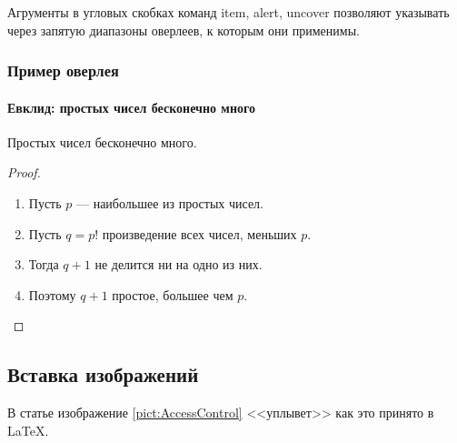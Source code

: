 Агрументы в угловых скобках команд item, alert, uncover позволяют указывать через запятую диапазоны оверлеев, к которым они применимы.
\begin{frame}
    \frametitle{Пример оверлея}
    \framesubtitle{Евклид: простых чисел бесконечно много}
    
    \begin{theorem}
        Простых чисел бесконечно много.
    \end{theorem}
    \begin{proof}
        \begin{enumerate}
            \item<1-> Пусть \alert<1,4>{$p$ --- наибольшее из простых} чисел.
            \item<2-> Пусть $q=p!$ произведение всех чисел, меньших $p$.
            \item<3-> Тогда $q + 1$ \alert<3>{не делится} ни на одно из них.
            \item<1-> Поэтому $q + 1$ \alert<4>{простое, большее чем $p$}.\qedhere
        \end{enumerate}
    \end{proof}
\end{frame}


\subsection{Вставка изображений}

В статье изображение \ref{pict:AccessControl} <<уплывет>> как это принято в \LaTeX.

